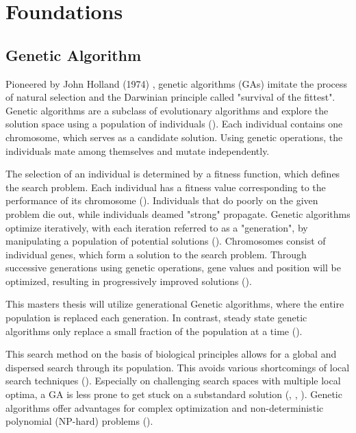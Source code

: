 \chapter{Foundations}
\label{chap:foundation}

\section{Genetic Algorithm}
\label{chap:foundation:genetic_algorithm}

Pioneered by John Holland (1974) , genetic algorithms (GAs) imitate the process of natural selection and the Darwinian principle called "survival of the fittest". Genetic algorithms are a subclass of evolutionary algorithms and explore the solution space using a population of individuals (\cite{mills_determining_2015}). Each individual contains one chromosome, which serves as a candidate solution. Using genetic operations, the individuals mate among themselves and mutate independently. 

The selection of an individual is determined by a fitness function, which defines the search problem. Each individual has a fitness value corresponding to the performance of its chromosome (\cite{majumdar_genetic_2015}). Individuals that do poorly on the given problem die out, while individuals deamed "strong" propagate. Genetic algorithms optimize iteratively, with each iteration referred to as a "generation", by manipulating a population of potential solutions (\cite{srinivas_genetic_1994}).
Chromosomes consist of individual genes, which form a solution to the search problem. Through successive generations using genetic operations, gene values and position will be optimized, resulting in progressively improved solutions (\cite{srinivas_genetic_1994}).

This masters thesis will utilize generational Genetic algorithms, where the entire population is replaced each generation. In contrast, steady state genetic algorithms only replace a small fraction of the population at a time (\cite{srinivas_genetic_1994}).

This search method on the basis of biological principles allows for a global and dispersed search through its population. This avoids various shortcomings of local search techniques (\cite{grefenstette_optimization_1986}). Especially on challenging search spaces with multiple local optima, a GA is less prone to get stuck on a substandard solution (\cite{katoch_review_2021}, \cite{xia_genetic_2019}, \cite{majumdar_genetic_2015}). Genetic algorithms offer advantages for complex optimization and non-deterministic polynomial (NP-hard) problems (\cite{hussain_trade-off_2020}).

